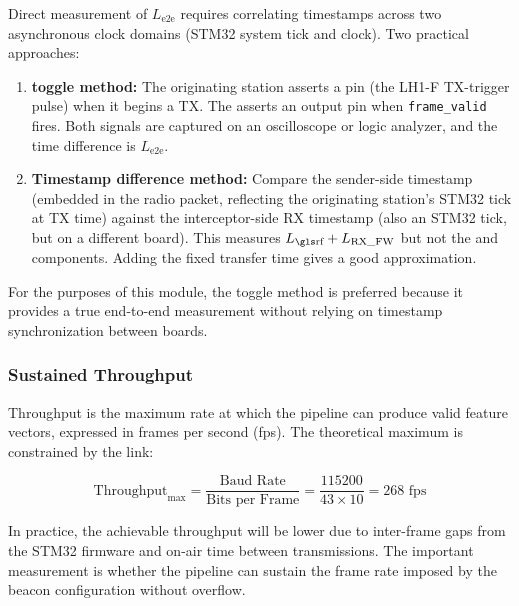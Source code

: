 \documentclass[11pt,letterpaper]{article}
\begin{document}
	\begin{tcolorbox}[infobox={Measuring Latency on Hardware}]
		Direct measurement of $L_{\text{e2e}}$ requires correlating timestamps across two asynchronous clock domains (STM32 system tick and \FPGA{} clock). Two practical approaches:
		\begin{enumerate}
			\item \textbf{\GPIO{} toggle method:} The originating station asserts a \GPIO{} pin (the LH1-F TX-trigger pulse) when it begins a TX. The \FPGA{} asserts an output pin when \texttt{frame\_valid} fires. Both signals are captured on an oscilloscope or logic analyzer, and the time difference is $L_{\text{e2e}}$.
			\item \textbf{Timestamp difference method:} Compare the sender-side timestamp (embedded in the radio packet, reflecting the originating station's STM32 tick at TX time) against the interceptor-side RX timestamp (also an STM32 tick, but on a different board). This measures $L_{\text{\RF{}}} + L_{\text{RX\_FW}}$ but not the \UART{} and \FPGA{} components. Adding the fixed \UART{} transfer time gives a good approximation.
		\end{enumerate}
		For the purposes of this module, the \GPIO{} toggle method is preferred because it provides a true end-to-end measurement without relying on timestamp synchronization between boards.
	\end{tcolorbox}

	\subsubsection{Sustained Throughput}

	Throughput is the maximum rate at which the pipeline can produce valid feature vectors, expressed in frames per second (fps). The theoretical maximum is constrained by the \UART{} link:

	\begin{equation}
		\text{Throughput}_{\text{max}} = \frac{\text{Baud Rate}}{\text{Bits per Frame}} = \frac{115200}{43 \times 10} = 268 \text{~fps}
		\label{eq:throughput}
	\end{equation}

	In practice, the achievable throughput will be lower due to inter-frame gaps from the STM32 firmware and \RF{} on-air time between transmissions. The important measurement is whether the \FPGA{} pipeline can sustain the frame rate imposed by the beacon configuration without \FIFO{} overflow.
\end{document}
